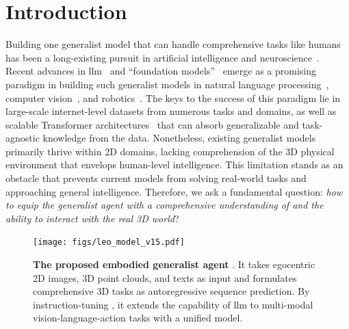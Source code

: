 \documentclass{article}
\begin{document}
\section{Introduction}\label{sec:intro}

Building one generalist model that can handle comprehensive tasks like humans has been a long-existing pursuit in artificial intelligence and neuroscience~\citep{lake2015human,lake2017building,zhu2020dark, mountcastle1979organizing,schmidhuber2018one,huang2022perceive}. Recent advances in \ac{llm}~\citep{brown2020language} and ``foundation models''~\citep{bommasani2021opportunities} emerge as a promising paradigm in building such generalist models in natural language processing~\citep{openai2022chatgpt,openai2023gpt4}, computer vision~\citep{kirillov2023segment,alayrac2022flamingo}, and robotics~\citep{brohan2022rt,brohan2023rt,reed2022generalist,driess2023palm,li2023multimodal}. The keys to the success of this paradigm lie in large-scale internet-level datasets from numerous tasks and domains, as well as scalable Transformer architectures~\citep{vaswani2017attention} that can absorb generalizable and task-agnostic knowledge from the data. 
Nonetheless, existing generalist models primarily thrive within 2D domains, lacking comprehension of the 3D physical environment that envelops human-level intelligence. This limitation stands as an obstacle that prevents current models from solving real-world tasks and approaching general intelligence. Therefore, we ask a fundamental question: \textit{how to equip the generalist agent with a comprehensive understanding of and the ability to interact with the real 3D world}?

\begin{figure}[t!]
\centering
\texttt{[image: figs/leo\_model\_v15.pdf]}%
  \caption{\textbf{The proposed embodied generalist agent \agent}. It takes egocentric 2D images, 3D point clouds, and texts as input and formulates comprehensive 3D tasks as autoregressive sequence prediction. By instruction-tuning \agent, it extends the capability of \ac{llm} to multi-modal vision-language-action tasks with a unified model.}
  \label{fig:leo}
  \vskip -0.05in
\end{figure}
\end{document}
